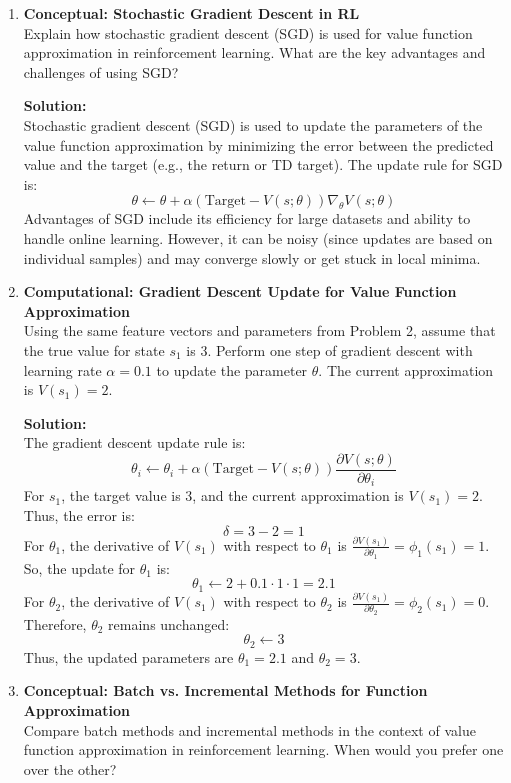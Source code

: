 \documentclass{article}
\begin{document}
\begin{enumerate}[label=Q\arabic*.]
\item \textbf{Conceptual: Stochastic Gradient Descent in RL} \\
Explain how stochastic gradient descent (SGD) is used for value function approximation in reinforcement learning. What are the key advantages and challenges of using SGD?

\textbf{Solution:} \\
Stochastic gradient descent (SGD) is used to update the parameters of the value function approximation by minimizing the error between the predicted value and the target (e.g., the return or TD target). The update rule for SGD is:
\[
\theta \leftarrow \theta + \alpha \left( \text{Target} - V(s; \theta) \right) \nabla_{\theta} V(s; \theta)
\]
Advantages of SGD include its efficiency for large datasets and ability to handle online learning. However, it can be noisy (since updates are based on individual samples) and may converge slowly or get stuck in local minima.

\item \textbf{Computational: Gradient Descent Update for Value Function Approximation} \\
Using the same feature vectors and parameters from Problem 2, assume that the true value for state $s_1$ is 3. Perform one step of gradient descent with learning rate $\alpha = 0.1$ to update the parameter $\theta$. The current approximation is $V(s_1) = 2$.

\textbf{Solution:} \\
The gradient descent update rule is:
\[
\theta_i \leftarrow \theta_i + \alpha \left( \text{Target} - V(s; \theta) \right) \frac{\partial V(s; \theta)}{\partial \theta_i}
\]
For $s_1$, the target value is 3, and the current approximation is $V(s_1) = 2$. Thus, the error is:
\[
\delta = 3 - 2 = 1
\]
For $\theta_1$, the derivative of $V(s_1)$ with respect to $\theta_1$ is $\frac{\partial V(s_1)}{\partial \theta_1} = \phi_1(s_1) = 1$. So, the update for $\theta_1$ is:
\[
\theta_1 \leftarrow 2 + 0.1 \cdot 1 \cdot 1 = 2.1
\]
For $\theta_2$, the derivative of $V(s_1)$ with respect to $\theta_2$ is $\frac{\partial V(s_1)}{\partial \theta_2} = \phi_2(s_1) = 0$. Therefore, $\theta_2$ remains unchanged:
\[
\theta_2 \leftarrow 3
\]
Thus, the updated parameters are $\theta_1 = 2.1$ and $\theta_2 = 3$.

\item \textbf{Conceptual: Batch vs. Incremental Methods for Function Approximation} \\
Compare batch methods and incremental methods in the context of value function approximation in reinforcement learning. When would you prefer one over the other?


\end{enumerate}
\end{document}
